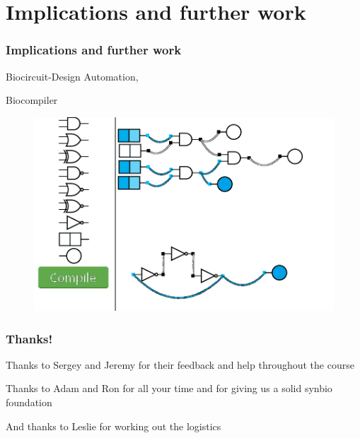 \documentclass{beamer}
\begin{document}
\section{Implications and further work}
\begin{frame}
\frametitle{Implications and further work}

Biocircuit-Design Automation,

Biocompiler

\begin{figure}
  \centering
  \includegraphics[scale=0.2]{repress_4and.png}
\end{figure}

\end{frame}


\begin{frame}
\frametitle{Thanks!}

Thanks to Sergey and Jeremy for their feedback and help throughout the course

Thanks to Adam and Ron for all your time and for giving us a solid synbio foundation

And thanks to Leslie for working out the logistics
\end{frame}
\end{document}
